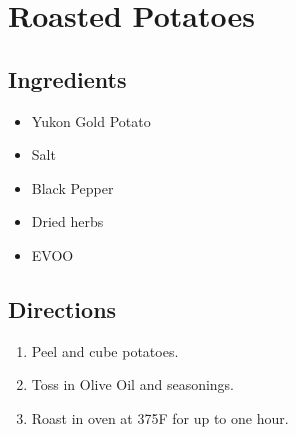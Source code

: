 \section{Roasted Potatoes}

\subsection{ Ingredients }

\begin{itemize}
  \item <2 lbs> Yukon Gold Potato
  \item <2 tsp> Salt
  \item <2 tsp> Black Pepper
  \item Dried herbs
  \item <1 tbs> EVOO
\end{itemize}

\subsection{ Directions }

\begin{enumerate}
  \item Peel and cube potatoes. 
  \item Toss in Olive Oil and seasonings. 
  \item Roast in oven at 375F for up to one hour. 
\end{enumerate}

